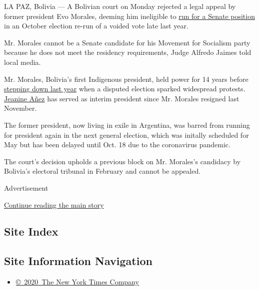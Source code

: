 LA PAZ, Bolivia --- A Bolivian court on Monday rejected a legal appeal
by former president Evo Morales, deeming him ineligible to
\href{https://www.nytimes3xbfgragh.onion/2020/02/04/world/americas/bolivia-evo-morales-senate.html}{run
for a Senate position} in an October election re-run of a voided vote
late last year.

Mr. Morales cannot be a Senate candidate for his Movement for Socialism
party because he does not meet the residency requirements, Judge Alfredo
Jaimes told local media.

Mr. Morales, Bolivia's first Indigenous president, held power for 14
years before
\href{https://www.nytimes3xbfgragh.onion/2019/11/10/world/americas/evo-morales-bolivia.html}{stepping
down last year} when a disputed election sparked widespread protests.
\href{https://www.nytimes3xbfgragh.onion/2019/11/16/world/americas/bolivia-anez-morales.html}{Jeanine
Añez} has served as interim president since Mr. Morales resigned last
November.

The former president, now living in exile in Argentina, was barred from
running for president again in the next general election, which was
initally scheduled for May but has been delayed until Oct. 18 due to the
coronavirus pandemic.

The court's decision upholds a previous block on Mr. Morales's candidacy
by Bolivia's electoral tribunal in February and cannot be appealed.

Advertisement

\protect\hyperlink{after-bottom}{Continue reading the main story}

\hypertarget{site-index}{%
\subsection{Site Index}\label{site-index}}

\hypertarget{site-information-navigation}{%
\subsection{Site Information
Navigation}\label{site-information-navigation}}

\begin{itemize}
\tightlist
\item
  \href{https://help.nytimes3xbfgragh.onion/hc/en-us/articles/115014792127-Copyright-notice}{©~2020~The
  New York Times Company}
\end{itemize}

